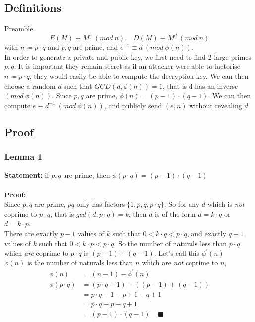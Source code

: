 \documentclass{article}
\begin{document}
\subsection{Definitions}
Preamble
\[ E(M) \equiv M^e \: (mod \: n),\;\;\; D(M) \equiv M^d \: (mod \: n)\]
with $ n \coloneqq p \cdot q $ and $p, q$ are prime, and $e^{-1} \equiv d \: (mod \: \phi (n))$. \\
In order to generate a private and public key, we first need to find 2 large primes $p, q$.
It is important they remain secret as if an attacker were able to factorise
$ n \coloneqq p \cdot q $,
they would easily be able to compute the decryption key. We can then choose a random $d$ such that $GCD(d, \phi (n)) = 1$,
that is d has an inverse $(mod \: \phi(n))$.
Since $p, q$ are prime, $\phi(n) = (p-1) \cdot (q-1) $.
We can then compute $e \equiv d^{-1} \: (mod \: \phi(n))$,
and publicly send $(e, n)$ without revealing $d$.

\subsection{Proof}
\subsubsection{Lemma 1}
\textbf{Statement:} if $p, q$ are prime, then $\phi(p \cdot q) = (p-1) \cdot (q-1)$ \\\\
\textbf{Proof:} \\
Since $p, q$ are prime, $pq$ only has factors $\{1, p, q, p \cdot q\}$.
So for any $d$ which is \emph{not} coprime to $p \cdot q$, that is $gcd(d, p \cdot q) = k$,
then $d$ is of the form $d=k \cdot q$ or $d= k \cdot p$. \\
There are exactly $p-1$ values of $k$ such that $0 < k \cdot q < p \cdot q$,
and exactly $q-1$ values of $k$ such that  $0 < k \cdot p < p \cdot q$.
So the number of naturals less than $p \cdot q$ which \emph{are} coprime to $p \cdot q$ is $(p-1) + (q-1)$. Let's call this $\phi^{'}(n)$\\
$\phi(n)$ is the number of naturals less than $n$ which are \emph{not} coprime to $n$,
\begin{align*}
    \phi(n)        & = (n-1) - \phi^{'}(n)                           \\
    \phi(p\cdot q) & = (p \cdot q - 1) - \left( (p-1) + (q-1)\right) \\
                   & = p \cdot q - 1 - p + 1 - q + 1                 \\
                   & = p \cdot q - p - q + 1                         \\
                   & = (p-1) \cdot (q-1)  \;\;\;\; \blacksquare
\end{align*}
\end{document}
